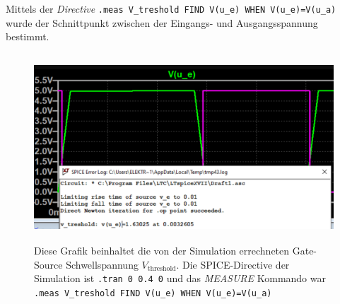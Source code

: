 \documentclass[12pt,english,ngerman]{scrartcl}
\begin{document}
Mittels der \textit{Directive} \texttt{.meas V\_treshold FIND V(u\_e) WHEN V(u\_e)=V(u\_a)} wurde der Schnittpunkt
zwischen der Eingangs- und Ausgangsspannung bestimmt.

\begin{figure}[H]
  \centering
    \includegraphics[width=\linewidth, height=7cm]{./simdaten_lab/cmos/inverter/treshold.png}
    \caption{Diese Grafik beinhaltet die von der Simulation errechneten
    Gate-Source Schwellspannung $V_{\mathrm{threshold}}$. Die SPICE-Directive
    der Simulation ist \texttt{.tran 0 0.4 0} und das \textit{MEASURE} Kommando
    war \texttt{.meas V\_treshold FIND V(u\_e) WHEN V(u\_e)=V(u\_a)}}
  \label{fig:sim_inv_threshold}
\end{figure}
\end{document}
